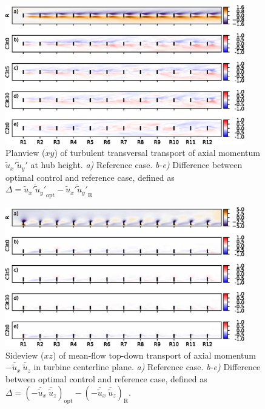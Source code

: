 \begin{figure}[hb!]
	\centering
	\includegraphics[width=0.93\textwidth]{chapters/optimal_induction_control/topview_uv.eps}
	\caption[Planview ($xy$) of turbulent transversal transport of axial momentum $\overline{\widetilde{u}_x' \widetilde{u}_y'}$ at hub height.]{Planview ($xy$) of turbulent transversal transport of axial momentum $\overline{\widetilde{u}_x' \widetilde{u}_y'}$ at hub height. \emph{a) } Reference case. \emph{b-e)} Difference between optimal control and reference case, defined as $\Delta = \overline{\widetilde{u}_x' \widetilde{u}_y'}_{\text{opt}} - \overline{\widetilde{u}_x' \widetilde{u}_y'}_{\text{R}}$  \label{fig:opt_ind_top_uv}}
\end{figure}	


\begin{figure}[ht!]
	\centering
	\includegraphics[width=0.93\textwidth]{chapters/optimal_induction_control/sideview_uwm.eps}
	\caption[Sideview ($xz$) of mean-flow top-down transport of axial momentum $- \overline{\widetilde{u}}_x~ \overline{\widetilde{u}}_z$ in turbine centerline plane.]{Sideview ($xz$) of mean-flow top-down transport of axial momentum $- \overline{\widetilde{u}}_x~ \overline{\widetilde{u}}_z$ in turbine centerline plane. \emph{a) } Reference case. \emph{b-e)} Difference between optimal control and reference case, defined as $\Delta = (- \overline{\widetilde{u}}_x~ \overline{\widetilde{u}}_z)_{\text{opt}} - (- \overline{\widetilde{u}}_x~ \overline{\widetilde{u}}_z)_{\text{R}}$. \label{fig:opt_ind_side_uwm}}
\end{figure}

